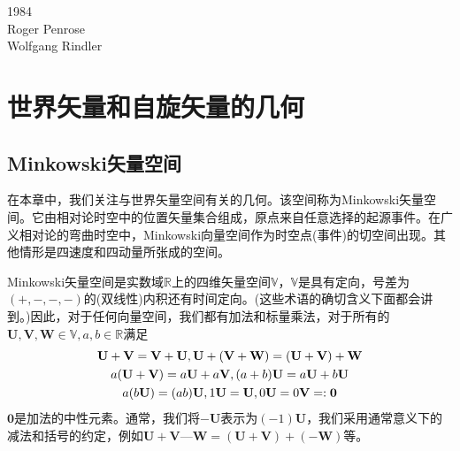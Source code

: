 \documentclass[utf8]{ctexbook}
\numberwithin{equation}{section}
\begin{document}
  1984
  \\Roger Penrose \\Wolfgang Rindler
\chapter{世界矢量和自旋矢量的几何}
\section{Minkowski矢量空间}\label{sec:11}

在本章中，我们关注与世界矢量空间有关的几何。该空间称为Minkowski矢量空间。它由相对论时空中的位置矢量集合组成，原点来自任意选择的起源事件。在广义相对论的弯曲时空中，Minkowski向量空间作为时空点(事件)的切空间出现。其他情形是四速度和四动量所张成的空间。

Minkowski矢量空间是实数域$\mathbb{R}$上的四维矢量空间$\mathbb{V}$，$\mathbb{V}$是具有定向，号差为$(+,-,-,-)$的(双线性)内积还有时间定向。(这些术语的确切含义下面都会讲到。)因此，对于任何向量空间，我们都有加法和标量乘法，对于所有的$\mathbf{U},\mathbf{V},\mathbf{W}\in\mathbb{V},a,b\in \mathbb{R}$满足
    \begin{gather}
        \mathbf{U}+\mathbf{V}=\mathbf{V}+\mathbf{U},\mathbf{U}+(\mathbf{V}+\mathbf{W})=(\mathbf{U}+\mathbf{V})+\mathbf{W}\notag \\
        a(\mathbf{U}+\mathbf{V})=a\mathbf{U}+a\mathbf{V},(a+b)\mathbf{U}=a\mathbf{U}+b\mathbf{U}\notag \\
         a(b\mathbf{U})=(ab)\mathbf{U},1\mathbf{U}=\mathbf{U},0\mathbf{U}=0\mathbf{V}=:\mathbf{0}
    \end{gather}
$\mathbf{0}$是加法的中性元素。通常，我们将$-\mathbf{U}$表示为$(-1)\mathbf{U}$，我们采用通常意义下的减法和括号的约定，例如$\mathbf{U}+\mathbf{V}—\mathbf{W}=(\mathbf{U}+\mathbf{V})+(-\mathbf{W})$等。
\end{document}
